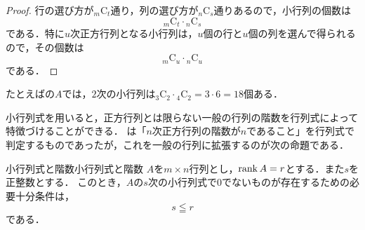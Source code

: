 \begin{tleftbar}
\begin{proof}
  行の選び方が${}_m \mathrm{C}_t$通り，列の選び方が${}_n \mathrm{C}_s$通りあるので，小行列の個数は
  \[
  {}_m \mathrm{C}_t \cdot {}_n \mathrm{C}_s
  \]
  である．特に$u$次正方行列となる小行列は，$u$個の行と$u$個の列を選んで得られるので，その個数は
  \[
  {}_m \mathrm{C}_u \cdot {}_n \mathrm{C}_u
  \]
  である．
\end{proof}
\end{tleftbar}

たとえばの$A$では，$2$次の小行列は${}_3\mathrm{C}_2 \cdot {}_4\mathrm{C}_2 = 3 \cdot 6 = 18$個ある．

小行列式を用いると，正方行列とは限らない一般の行列の階数を行列式によって特徴づけることができる．
は「$n$次正方行列の階数が$n$であること」を行列式で判定するものであったが，これを一般の行列に拡張するのが次の命題である．

\begin{prop}{小行列式と階数}{小行列式と階数}
  $A$を$m \times n$行列とし，$\operatorname{rank} A = r$とする．また$s$を正整数とする．
  このとき，$A$の$s$次の小行列式で$0$でないものが存在するための必要十分条件は，
  \[
  s \leqq r
  \]
  である．
\end{prop}

